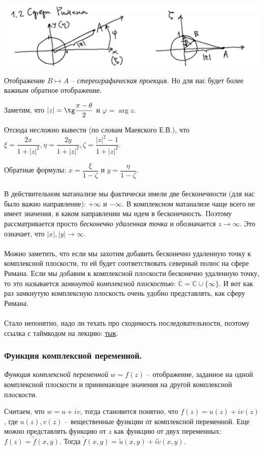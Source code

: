 \includegraphics[scale=0.7]{img/3.png}
 
 \begin{definition*}
Отображение $B \longmapsto A$ -- \textit{стереографическая проекция.} Но для нас будет более важным обратное отображение. 
 \end{definition*}

Заметим, что $|z| = \tg \dfrac{\pi - \theta}{2} $ и $\varphi = \operatorname{arg} z$.

 Отсюда несложно вывести (по словам Маевского Е.В.), что $\xi = \dfrac{2x}{1 + |z|^2}, \eta = \dfrac{2y}{1 + |z|^2}, \zeta = \dfrac{|z|^2 - 1}{1 + |z|^2}$.  
 
 Обратные формулы: $x = \dfrac{\xi}{1 - \zeta}$ и $y = \dfrac{\eta}{1 - \zeta}$.
 \\
 \\
В действительном матанализе мы фактически имели две бесконечности (для нас было важно направление): $+\infty $ и $-\infty $. В комплексном матанализе чаще всего не имеет значения, в каком направлении мы идем в бесконечность. Поэтому рассматривается просто \textit{бесконечно удаленная точка }и обозначается $z \to \infty$. Это означает, что $|x|, |y| \to \infty$.  
\\
\\
Можно заметить, что если мы захотим добавить бесконечно удаленную точку к комплексной плоскости, то ей будет соответствовать северный полюс на сфере Римана.  Если мы добавим к комплексной плоскости бесконечно удаленную точку, то  это называется \textit{замкнутой комплексной плоскостью}: $\overline{\mathbb{C}}= \mathbb{C} \cup \{ \infty \}$.  И вот как раз замкнутую комплексную плоскость очень удобно представлять, как сферу Римана.
\\
\\
Стало непонятно, надо ли техать про  сходимость последовательности, поэтому ссылка с таймкодом на лекцию: \href{https://youtu.be/lUqrd4aP3Zc?t=1777}{тык}.
  
  
\subsubsection{Функция комплексной переменной.}
\begin{definition*}
\textit{Функция комплексной переменной }$w = f(z)$ -- отображение, заданное на одной комплексной плоскости и принимающее значения на другой комплексной плоскости. 
\end{definition*}
Считаем, что $w = u + iv$, тогда становится понятно, что $f(z) = u(z) + iv(z)$, где $u(z), v(z) $ -- вещественные функции от комплексной переменной. Еще можно представлять функцию от $z$ как функцию от двух переменных: $f(z) = \widetilde{f}(x, y)$.  Тогда $\widetilde{f}(x, y) = \widetilde{u}(x, y) + i \widetilde{v}(x, y)$.

